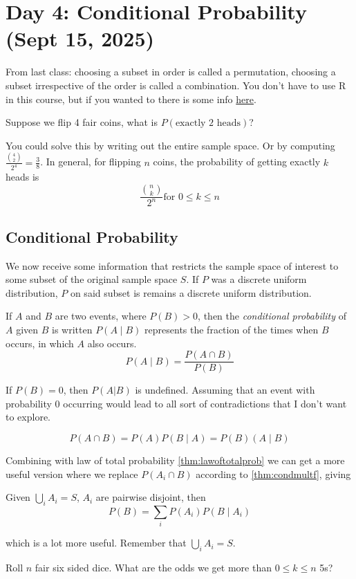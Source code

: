 \section{Day 4: Conditional Probability (Sept 15, 2025)}

From last class: choosing a subset in order is called a permutation, choosing a subset irrespective of the order is called a combination. You don't have to use R in this course, but if you wanted to there is some info \href{http://probability.ca/Rinfo.html}{here}.

\begin{problem}
    Suppose we flip 4 fair coins, what is $P(\text{exactly 2 heads})$?
\end{problem}

\noindent You could solve this by writing out the entire sample space. Or by computing $\frac{\binom{4}{2}}{2^4} = \frac{3}{8}$. In general, for flipping $n$ coins, the probability of getting exactly $k$ heads is
\[
\frac{\binom{n}{k}}{2^n} \text{for $0 \leq k \leq n$}
\]

\subsection{Conditional Probability}

We now receive some information that restricts the sample space of interest to some subset of the original sample space $S$. If $P$ was a discrete uniform distribution, $P$ on said subset is remains a discrete uniform distribution. 

\begin{definition}
    If $A$ and $B$ are two events, where $P(B) > 0$, then the \textit{conditional probability} of $A$ given $B$ is written $P(A \mid B)$  represents the fraction of the times when $B$ occurs, in which $A$ also occurs. 
\[
P(A \mid B) = \frac{P(A \cap B)}{P(B)}
\]
\end{definition}

If $P(B) = 0$, then $P(A | B)$ is undefined. Assuming that an event with probability 0 occurring would lead to all sort of contradictions that I don't want to explore.

\begin{simplethm} \label{thm:condmultf}
    \[P(A \cap B) = P(A)P(B \mid A) = P(B)(A \mid B)\]
\end{simplethm}

Combining with law of total probability \ref{thm:lawoftotalprob} we can get a more useful version where we replace $P(A_i \cap B)$ according to \ref{thm:condmultf}, giving
\begin{theorem} 
    Given $\bigcup_i A_i = S$, $A_i$ are pairwise disjoint, then \label{thm:ltpcond}
\[
P(B) = \sum_i P(A_i)P(B \mid A_i)
\]

\end{theorem}
which is a lot more useful. Remember that $\bigcup_i A_i = S$. 

\begin{problem}[Challenge]
Roll $n$ fair six sided dice. What are the odds we get more than $0 \leq k \leq n$ 5s? 
\end{problem}


